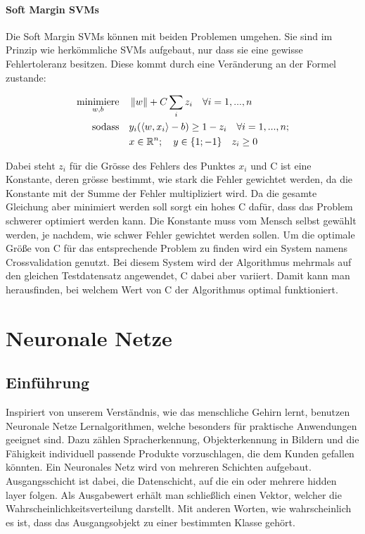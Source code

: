 \paragraph{Soft Margin SVMs}
Die Soft Margin SVMs können mit beiden Problemen umgehen.
Sie sind im Prinzip wie herkömmliche SVMs aufgebaut, nur dass sie eine gewisse Fehlertoleranz besitzen. Diese kommt durch eine Veränderung an der Formel zustande:

\begin{align*}
	\underset{w,b}{\operatorname{minimiere}} \quad & \left\lVert w\right\rVert + C\sum_{i}{z_{i}} \quad \forall i = 1,...,n \\
	\operatorname{sodass} \quad & y_{i}(\langle w,x_{i} \rangle - b) \geq 1 - z_{i} \quad \forall i = 1,...,n; \\ 
	&x \in \mathbb{R}^n; \quad y \in \{1; -1\} \quad z_{i} \geq 0 \\
\end{align*}

Dabei steht $z_{i}$ für die Grösse des Fehlers des Punktes $x_{i}$ und C ist eine Konstante, deren grösse bestimmt, wie stark die Fehler gewichtet werden, da die Konstante mit der Summe der Fehler multipliziert wird. Da die gesamte Gleichung aber minimiert werden soll sorgt ein hohes C dafür, dass das Problem schwerer optimiert werden kann. Die Konstante muss vom Mensch selbst gewählt werden, je nachdem, wie schwer Fehler gewichtet werden sollen.
Um die optimale Größe von C für das entsprechende Problem zu finden wird ein System namens Crossvalidation genutzt. Bei diesem System wird der Algorithmus mehrmals auf den gleichen Testdatensatz angewendet, C dabei aber variiert. Damit kann man herausfinden, bei welchem Wert von C der Algorithmus optimal funktioniert.


\section{Neuronale Netze}
\author {Farhadiba Mohammed}

\subsection{Einführung}

Inspiriert von unserem Verständnis, wie das menschliche Gehirn lernt, benutzen Neuronale Netze Lernalgorithmen, welche besonders für praktische Anwendungen geeignet sind.
Dazu zählen Spracherkennung, Objekterkennung in Bildern und die Fähigkeit individuell passende Produkte vorzuschlagen, die dem Kunden gefallen könnten. 
Ein Neuronales Netz wird von mehreren Schichten aufgebaut. Ausgangsschicht ist dabei, die Datenschicht, auf die ein oder mehrere hidden layer folgen. Als Ausgabewert erhält man schließlich einen Vektor, welcher die Wahrscheinlichkeitsverteilung darstellt. Mit anderen Worten, wie wahrscheinlich es ist, dass das Ausgangsobjekt zu einer bestimmten Klasse gehört.

